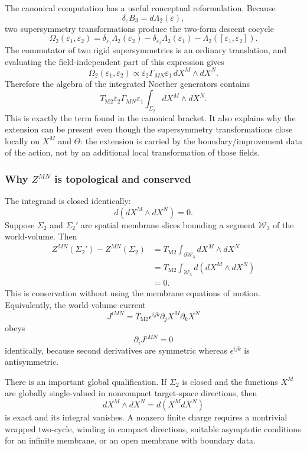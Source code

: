 \documentclass[
  10pt,
  a4paper,
  openany]{book}
\begin{document}
The canonical computation has a useful conceptual reformulation. Because
\[
\delta_\varepsilon B_3=d\Lambda_2(\varepsilon),
\] two supersymmetry transformations produce the two-form descent
cocycle \[
\Omega_2(\varepsilon_1,\varepsilon_2)
=\delta_{\varepsilon_1}\Lambda_2(\varepsilon_2)
-\delta_{\varepsilon_2}\Lambda_2(\varepsilon_1)
-\Lambda_2([\varepsilon_1,\varepsilon_2]).
\] The commutator of two rigid supersymmetries is an ordinary
translation, and evaluating the field-independent part of this
expression gives \[
\Omega_2(\varepsilon_1,\varepsilon_2)
\propto
\bar\varepsilon_2\Gamma_{MN}\varepsilon_1
\,dX^M\wedge dX^N.
\] Therefore the algebra of the integrated Noether generators contains
\[
T_{\mathrm{M2}}
\bar\varepsilon_2\Gamma_{MN}\varepsilon_1
\int_{\Sigma_2}dX^M\wedge dX^N.
\] This is exactly the term found in the canonical bracket. It also
explains why the extension can be present even though the supersymmetry
transformations close locally on \(X^M\) and \(\Theta\): the extension
is carried by the boundary/improvement data of the action, not by an
additional local transformation of those fields.

\subsubsection{\texorpdfstring{Why \(Z^{MN}\) is topological and
conserved}{Why Z\^{}\{MN\} is topological and conserved}}\label{why-zmn-is-topological-and-conserved}

The integrand is closed identically: \[
d(dX^M\wedge dX^N)=0.
\] Suppose \(\Sigma_2\) and \(\Sigma_2'\) are spatial membrane slices
bounding a segment \(\mathcal W_3\) of the world-volume. Then \[
\begin{aligned}
Z^{MN}(\Sigma_2')-Z^{MN}(\Sigma_2)
&=T_{\mathrm{M2}}
\int_{\partial\mathcal W_3}dX^M\wedge dX^N\\
&=T_{\mathrm{M2}}
\int_{\mathcal W_3}d(dX^M\wedge dX^N)\\
&=0.
\end{aligned}
\] This is conservation without using the membrane equations of motion.
Equivalently, the world-volume current \[
J^{iMN}
=T_{\mathrm{M2}}\epsilon^{ijk}
\partial_jX^M\partial_kX^N
\] obeys \[
\partial_iJ^{iMN}=0
\] identically, because second derivatives are symmetric whereas
\(\epsilon^{ijk}\) is antisymmetric.

There is an important global qualification. If \(\Sigma_2\) is closed
and the functions \(X^M\) are globally single-valued in noncompact
target-space directions, then \[
dX^M\wedge dX^N=d(X^M dX^N)
\] is exact and its integral vanishes. A nonzero finite charge requires
a nontrivial wrapped two-cycle, winding in compact directions, suitable
asymptotic conditions for an infinite membrane, or an open membrane with
boundary data.
\end{document}
